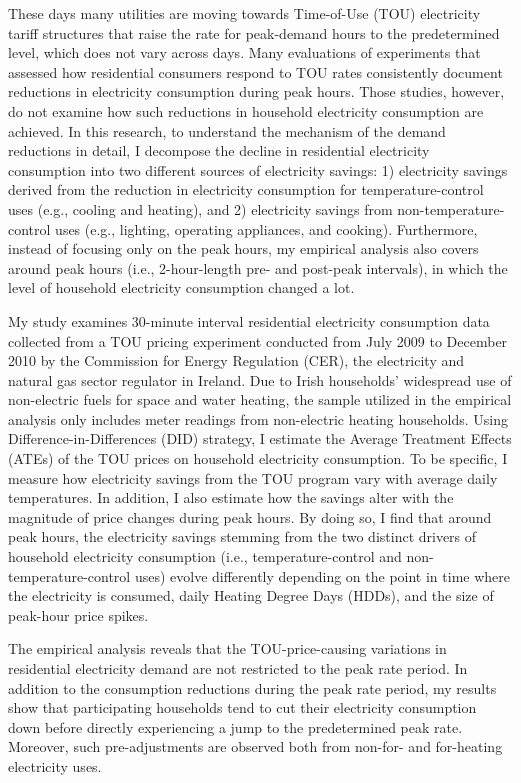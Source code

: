 These days many utilities are moving towards Time-of-Use (TOU) electricity tariff structures that raise the rate for peak-demand hours to the predetermined level, which does not vary across days. Many evaluations of experiments that assessed how residential consumers respond to TOU rates consistently document reductions in electricity consumption during peak hours. Those studies, however, do not examine how such reductions in household electricity consumption are achieved. In this research, to understand the mechanism of the demand reductions in detail, I decompose the decline in residential electricity consumption into two different sources of electricity savings: 1) electricity savings derived from the reduction in electricity consumption for temperature-control uses (e.g., cooling and heating), and 2) electricity savings from non-temperature-control uses (e.g., lighting, operating appliances, and cooking). Furthermore, instead of focusing only on the peak hours, my empirical analysis also covers around peak hours (i.e., 2-hour-length pre- and post-peak intervals), in which the level of household electricity consumption changed a lot.

My study examines 30-minute interval residential electricity consumption data collected from a TOU pricing experiment conducted from July 2009 to December 2010 by the Commission for Energy Regulation (CER), the electricity and natural gas sector regulator in Ireland. Due to Irish households' widespread use of non-electric fuels for space and water heating, the sample utilized in the empirical analysis only includes meter readings from non-electric heating households. Using Difference-in-Differences (DID) strategy, I estimate the Average Treatment Effects (ATEs) of the TOU prices on household electricity consumption. To be specific, I measure how electricity savings from the TOU program vary with average daily temperatures. In addition, I also estimate how the savings alter with the magnitude of price changes during peak hours. By doing so, I find that around peak hours, the electricity savings stemming from the two distinct drivers of household electricity consumption (i.e., temperature-control and non-temperature-control uses) evolve differently depending on the point in time where the electricity is consumed, daily Heating Degree Days (HDDs), and the size of peak-hour price spikes.

The empirical analysis reveals that the TOU-price-causing variations in residential electricity demand are not restricted to the peak rate period. In addition to the consumption reductions during the peak rate period, my results show that participating households tend to cut their electricity consumption down before directly experiencing a jump to the predetermined peak rate. Moreover, such pre-adjustments are observed both from non-for- and for-heating electricity uses. 

